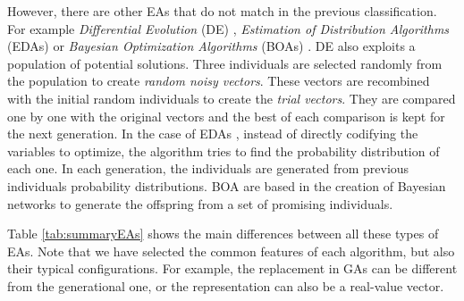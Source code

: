 \documentclass{article}
\begin{document}
\begin{description}
\end{description}


However, there are other EAs that do not match in the previous
classification. For example \textit{Differential Evolution} (DE)
\cite{storn1997differential}, \textit{Estimation of Distribution
  Algorithms} (EDAs) \cite{larranaga2002estimation} or
\textit{Bayesian Optimization Algorithms} (BOAs)
\cite{pelikan2005bayesian}. DE \cite{storn1997differential} also
exploits a population of potential solutions. Three individuals are
selected randomly from the population to create \textit{random noisy
  vectors}. These vectors are recombined with the initial random
individuals to create the \textit{trial vectors}. They are compared
one by one with the original vectors and the best of each comparison
is kept for the next generation. In the case of EDAs
\cite{larranaga2002estimation}, instead of directly codifying the
variables to optimize, the algorithm tries to find the probability
distribution of each one. In each generation, the individuals are
generated from previous individuals probability distributions. BOA
\cite{pelikan2005bayesian} are based in the creation of Bayesian
networks to generate the offspring from a set of promising
individuals. %


Table \ref{tab:summaryEAs} shows the main differences between all
these types of EAs. Note that we have selected the common features of
each algorithm, but also their typical configurations. For example,
the replacement in GAs can be different from the generational one, or
the representation can also be a real-value vector.  
\end{document}
